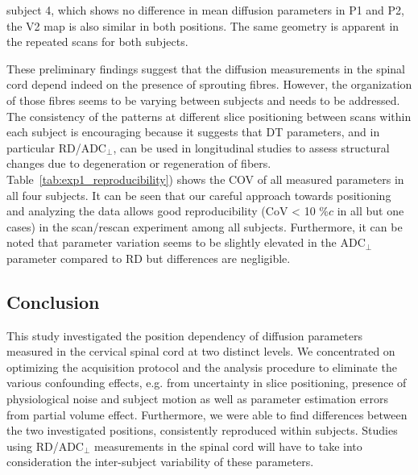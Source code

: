 subject 4, which shows no difference in mean diffusion parameters in P1 and P2, the V2 map is also similar in both positions. The same geometry is apparent in the repeated scans for both subjects.

These preliminary findings suggest that the diffusion measurements in the spinal cord depend indeed on the presence of sprouting fibres. However, the organization of those fibres seems to be varying between subjects and needs to be addressed. The consistency of the patterns at different slice positioning between scans within each subject is encouraging because it suggests that DT parameters, and in particular RD/ADC$_\perp$, can be used in longitudinal studies to assess structural changes due to degeneration or regeneration of fibers. Table~\ref{tab:exp1_reproducibility}) shows the COV of all measured parameters in all four subjects. It can be seen that our careful approach towards positioning and analyzing the data allows good reproducibility (CoV < 10 $\%c$ in all but one cases) in the scan/rescan experiment among all subjects. Furthermore, it can be noted that parameter variation seems to be slightly elevated in the ADC$_\perp$ parameter compared to RD but differences are negligible.

\begin{figure}
  \centering
  \label{fig:experiment1_V2maps}
\end{figure}

\subsection*{Conclusion} This study investigated the position dependency of diffusion parameters measured in the cervical spinal cord at two distinct levels. We concentrated on optimizing the acquisition protocol and the analysis procedure to eliminate the various confounding effects, e.g. from uncertainty in slice positioning, presence of physiological noise and subject motion as well as parameter estimation errors from partial volume effect. Furthermore, we were able to find differences between the two investigated positions, consistently reproduced within subjects. Studies using RD/ADC$_\perp$ measurements in the spinal cord will have to take into consideration the inter-subject variability of these parameters.
